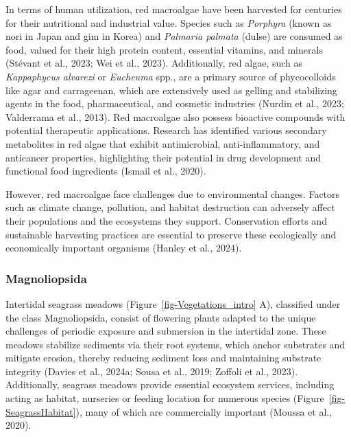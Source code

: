 \documentclass[
  letterpaper,
  11pt,
  english,
  singlespacing,
  headsepline]{MastersDoctoralThesis}
\begin{document}
\begin{spacing}{1.5}
In terms of human utilization, red macroalgae have been harvested for
centuries for their nutritional and industrial value. Species such as
\emph{Porphyra} (known as nori in Japan and gim in Korea) and
\emph{Palmaria palmata} (dulse) are consumed as food, valued for their
high protein content, essential vitamins, and minerals (Stévant et al.,
2023; Wei et al., 2023). Additionally, red algae, such as
\emph{Kappaphycus alvarezi} or \emph{Eucheuma} spp., are a primary
source of phycocolloids like agar and carrageenan, which are extensively
used as gelling and stabilizing agents in the food, pharmaceutical, and
cosmetic industries (Nurdin et al., 2023; Valderrama et al., 2013). Red
macroalgae also possess bioactive compounds with potential therapeutic
applications. Research has identified various secondary metabolites in
red algae that exhibit antimicrobial, anti-inflammatory, and anticancer
properties, highlighting their potential in drug development and
functional food ingredients (Ismail et al., 2020).

However, red macroalgae face challenges due to environmental changes.
Factors such as climate change, pollution, and habitat destruction can
adversely affect their populations and the ecosystems they support.
Conservation efforts and sustainable harvesting practices are essential
to preserve these ecologically and economically important organisms
(Hanley et al., 2024).

\subsubsection{Magnoliopsida}\label{magnoliopsida}

Intertidal seagrass meadows (Figure~\ref{fig-Vegetations_intro} A),
classified under the class Magnoliopsida, consist of flowering plants
adapted to the unique challenges of periodic exposure and submersion in
the intertidal zone. These meadows stabilize sediments via their root
systems, which anchor substrates and mitigate erosion, thereby reducing
sediment loss and maintaining substrate integrity (Davies et al., 2024a;
Sousa et al., 2019; Zoffoli et al., 2023). Additionally, seagrass
meadows provide essential ecosystem services, including acting as
habitat, nurseries or feeding location for numerous species
(Figure~\ref{fig-SeagrassHabitat}), many of which are commercially
important (Moussa et al., 2020).

\begin{figure}

\centering{

}
\end{figure}
\end{spacing}
\end{document}
